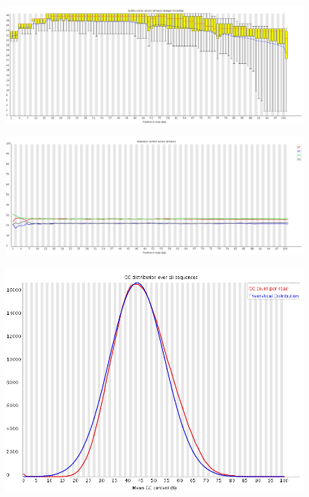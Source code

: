\documentclass{article}
\begin{document}
    \begin{figure}[htbp]
      \centering
      \includegraphics[width=1.0\linewidth] {fastqc/4_120719_BD158KACXX_1_nophix-sort-dup_fastqc/Images/per_base_quality.png}
      \caption{}
    \end{figure}
    \begin{figure}[htbp]
      \centering
      \includegraphics[width=0.85\linewidth] {fastqc/4_120719_BD158KACXX_1_nophix-sort-dup_fastqc/Images/per_base_sequence_content.png}
      \caption{}
    \end{figure}
    \begin{figure}[htbp]
      \centering
      \includegraphics[width=0.85\linewidth] {fastqc/4_120719_BD158KACXX_1_nophix-sort-dup_fastqc/Images/per_sequence_gc_content.png}
      \caption{}
    \end{figure}
\end{document}
